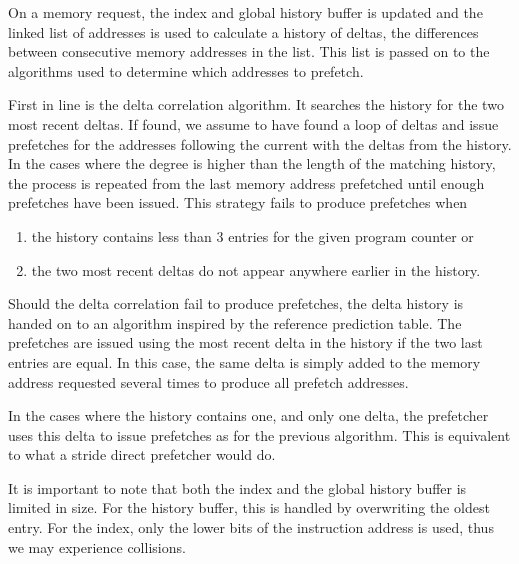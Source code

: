 On a memory request, the index and global history buffer is updated and the
linked list of addresses is used to calculate a history of deltas, the
differences between consecutive memory addresses in the list.
This list is passed on to the algorithms used to determine which addresses to
prefetch.

First in line is the delta correlation algorithm.
It searches the history for the two most recent deltas.
If found, we assume to have found a loop of deltas and issue prefetches for the
addresses following the current with the deltas from the history.
In the cases where the degree is higher than the length of the matching history,
the process is repeated from the last memory address prefetched until enough
prefetches have been issued.
This strategy fails to produce prefetches when

\begin{enumerate}
	\item the history contains less than 3 entries for the given program
		counter or
	\item the two most recent deltas do not appear anywhere earlier in the
		history.
\end{enumerate}

Should the delta correlation fail to produce prefetches, the delta history is
handed on to an algorithm inspired by the reference prediction table.
The prefetches are issued using the most recent delta in the history if the two
last entries are equal.
In this case, the same delta is simply added to the memory address requested
several times to produce all prefetch addresses.

In the cases where the history contains one, and only one delta, the prefetcher
uses this delta to issue prefetches as for the previous algorithm.
This is equivalent to what a stride direct prefetcher would do.

It is important to note that both the index and the global history buffer is
limited in size. For the history buffer, this is handled by overwriting the
oldest entry. For the index, only the lower bits of the instruction address is
used, thus we may experience collisions.

